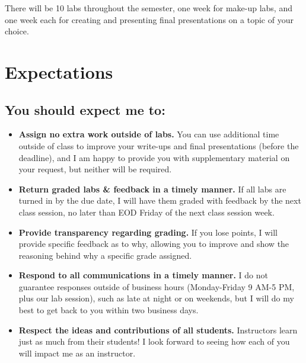\documentclass[11pt]{article}
\begin{document}
\noindent There will be 10 labs throughout the semester, one week for make-up labs, and one week each for creating and presenting final presentations on a topic of your choice. 

\section*{Expectations}

\subsection*{You should expect me to:}

\begin{itemize}
\item \textbf{Assign no extra work outside of labs.} You can use additional time outside of class to improve your write-ups and final presentations (before the deadline), and I am happy to provide you with supplementary material on your request, but neither will be required. 
\item \textbf{Return graded labs \& feedback in a timely manner.} If all labs are turned in by the due date, I will have them graded with feedback by the next class session, no later than EOD Friday of the next class session week.
\item \textbf{Provide transparency regarding grading.} If you lose points, I will provide specific feedback as to why, allowing you to improve and show the reasoning behind why a specific grade assigned.
\item \textbf{Respond to all communications in a timely manner.} I do not guarantee responses outside of business hours (Monday-Friday 9 AM-5 PM, plus our lab session), such as late at night or on weekends, but I will do my best to get back to you within two business days. %
\item \textbf{Respect the ideas and contributions of all students.} Instructors learn just as much from their students! I look forward to seeing how each of you will impact me as an instructor.
\end{itemize}
\end{document}
